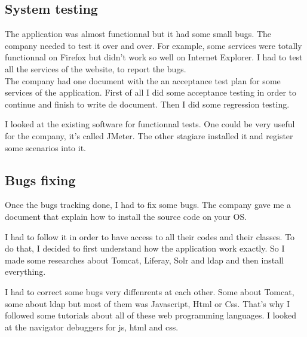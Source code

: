 \newpage
\subsection{System testing}
The application was almost functionnal but it had some small bugs. The company needed to test it over and over.
For example, some services were totally functionnal on Firefox but didn't work so well on
Internet Explorer. I had to test all the services of the website, to report the bugs. \\
The company had one document with the an acceptance test plan for some
services of the application. 
First of all I did some acceptance testing in order to continue and finish 
to write de document. 
Then I did some regression testing.


I looked at the existing software for functionnal tests. One could be very useful for the company, it's called JMeter. The other stagiare installed it and register some scenarios into it. 



\newpage
\subsection{Bugs fixing}
Once the bugs tracking done, I had to fix some bugs. 
The company gave me a document that explain how to install the source code on your OS. 

I had to follow it in order to have access to all their codes and their classes. To do that, I decided to first understand how the application work exactly. 
So I made some researches about Tomcat, Liferay, Solr and ldap and then install everything. 

I had to correct some bugs very diffenrents at each other. Some about Tomcat, some about ldap
but most of them was Javascript, Html or Css. 
That's why I followed some tutorials about all of these web programming languages. 
I looked at the navigator debuggers for js, html and css. 


